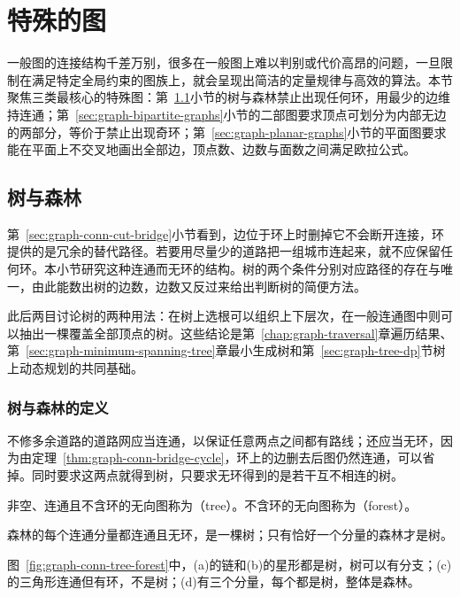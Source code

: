 \section{特殊的图}
\label{sec:graph-special-graphs}

一般图的连接结构千差万别，很多在一般图上难以判别或代价高昂的问题，一旦限制在满足特定全局约束的图族上，就会呈现出简洁的定量规律与高效的算法。本节聚焦三类最核心的特殊图：第~\ref{sec:graph-trees-forests}小节的树与森林禁止出现任何环，用最少的边维持连通；第~\ref{sec:graph-bipartite-graphs}小节的二部图要求顶点可划分为内部无边的两部分，等价于禁止出现奇环；第~\ref{sec:graph-planar-graphs}小节的平面图要求能在平面上不交叉地画出全部边，顶点数、边数与面数之间满足欧拉公式。

\subsection{树与森林}
\label{sec:graph-trees-forests}

第~\ref{sec:graph-conn-cut-bridge}小节看到，边位于环上时删掉它不会断开连接，环提供的是冗余的替代路径。若要用尽量少的道路把一组城市连起来，就不应保留任何环。本小节研究这种连通而无环的结构。树的两个条件分别对应路径的存在与唯一，由此能数出树的边数，边数又反过来给出判断树的简便方法。

此后两目讨论树的两种用法：在树上选根可以组织上下层次，在一般连通图中则可以抽出一棵覆盖全部顶点的树。这些结论是第~\ref{chap:graph-traversal}章遍历结果、第~\ref{sec:graph-minimum-spanning-tree}章最小生成树和第~\ref{sec:graph-tree-dp}节树上动态规划的共同基础。

\subsubsection{树与森林的定义}
\label{sec:graph-conn-tree-definition}

不修多余道路的道路网应当连通，以保证任意两点之间都有路线；还应当无环，因为由定理~\ref{thm:graph-conn-bridge-cycle}，环上的边删去后图仍然连通，可以省掉。同时要求这两点就得到树，只要求无环得到的是若干互不相连的树。

\begin{definition}[树与森林]
\label{def:graph-conn-tree}
非空、连通且不含环的无向图称为（tree）。不含环的无向图称为（forest）。
\end{definition}

森林的每个连通分量都连通且无环，是一棵树；只有恰好一个分量的森林才是树。

图~\ref{fig:graph-conn-tree-forest}中，(a)的链和(b)的星形都是树，树可以有分支；(c)的三角形连通但有环，不是树；(d)有三个分量，每个都是树，整体是森林。

